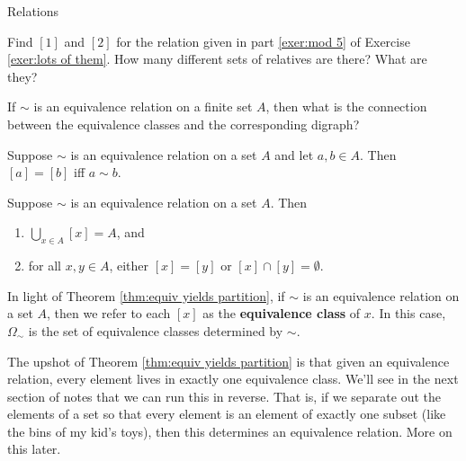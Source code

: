 \begin{section}{Relations}
\begin{exercise}
Find $[1]$ and $[2]$ for the relation given in part \ref{exer:mod 5} of Exercise \ref{exer:lots of them}.  How many different sets of relatives are there?  What are they?
\end{exercise}

\begin{exercise}
If $\sim$ is an equivalence relation on a finite set $A$, then what is the connection between the equivalence classes and the corresponding digraph?
\end{exercise}

\begin{theorem}
Suppose $\sim$ is an equivalence relation on a set $A$ and let $a,b\in A$.  Then $[a]=[b]$ iff $a\sim b$.
\end{theorem}

\begin{theorem}\label{thm:equiv yields partition}
Suppose $\sim$ is an equivalence relation on a set $A$.  Then
\begin{enumerate}
\item $\bigcup_{x\in A}[x]=A$, and
\item for all $x,y\in A$, either $[x]=[y]$ or $[x]\cap [y]=\emptyset$.
\end{enumerate}
\end{theorem}

\begin{definition}
In light of Theorem \ref{thm:equiv yields partition}, if $\sim$ is an equivalence relation on a set $A$, then we refer to each $[x]$ as the \textbf{equivalence class} of $x$.  In this case, $\Omega_{\sim}$ is the set of equivalence classes determined by $\sim$.
\end{definition}

\begin{remark}
The upshot of Theorem \ref{thm:equiv yields partition} is that given an equivalence relation, every element lives in exactly one equivalence class.  We'll see in the next section of notes that we can run this in reverse.  That is, if we separate out the elements of a set so that every element is an element of exactly one subset (like the bins of my kid's toys), then this determines an equivalence relation.  More on this later.
\end{remark}

\end{section}


